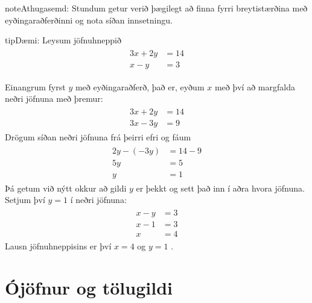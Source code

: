 \documentclass[a4paper,10pt,icelandic]{sphinxmanual}
\begin{document}
\begin{sphinxadmonition}{note}{Athugasemd:}
Stundum getur verið þægilegt að finna fyrri breytistærðina með eyðingaraðferðinni og nota síðan innsetningu.
\end{sphinxadmonition}

\begin{sphinxadmonition}{tip}{Dæmi:}
Leysum jöfnuhneppið
\begin{equation*}
\begin{split}\begin{aligned}
3x+2y&=14 \\
x-y&=3
\end{aligned}\end{split}
\end{equation*}

Einangrum fyrst \(y\) með eyðingaraðferð, það er, eyðum \(x\) með því að margfalda neðri jöfnuna með þremur:
\begin{equation*}
\begin{split}\begin{aligned}
3x+2y&=14 \\
3x-3y&=9
\end{aligned}\end{split}
\end{equation*}
Drögum síðan neðri jöfnuna frá þeirri efri og fáum
\begin{equation*}
\begin{split}\begin{aligned}
2y-(-3y) &=14-9 \\
5y &= 5 \\
y&=1
\end{aligned}\end{split}
\end{equation*}
Þá getum við nýtt okkur að gildi \(y\) er þekkt og sett það inn í aðra hvora jöfnuna.
Setjum því \(y=1\) í neðri jöfnuna:
\begin{equation*}
\begin{split}\begin{aligned}
x-y&=3 \\
x-1&=3 \\
x&=4
\end{aligned}\end{split}
\end{equation*}
Lausn jöfnuhneppisins er því \(x=4\) og \(y=1\) .
\end{sphinxadmonition}


\section{Ójöfnur og tölugildi}
\label{\detokenize{Kafli02:ojofnur-og-tolugildi}}
\end{document}
